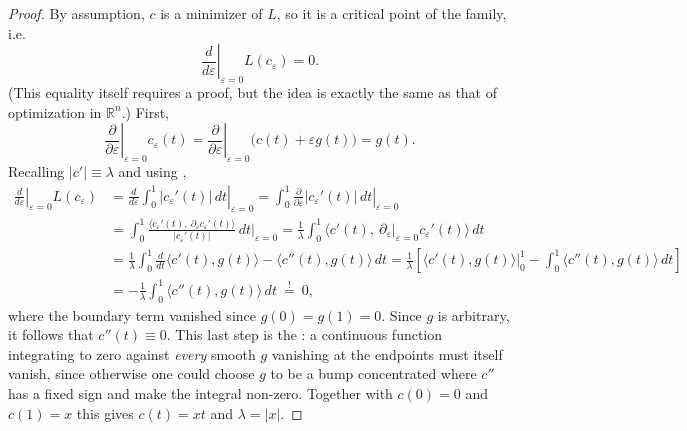 \begin{proof}
By assumption, $c$ is a minimizer of $L$, so it is a critical point of the family, i.e.
\[\left.\frac{d}{d\varepsilon}\right|_{\varepsilon=0} L(c_\varepsilon) = 0.\]
(This equality itself requires a proof, but the idea is exactly the same as that of
optimization in $\mathbb{R}^n$.) First,
\[\left.\frac{\partial}{\partial\varepsilon}\right|_{\varepsilon=0} c_\varepsilon(t)
  = \left.\frac{\partial}{\partial\varepsilon}\right|_{\varepsilon=0}
    \big(c(t)+\varepsilon g(t)\big) = g(t).\]
Recalling $\lvert c'\rvert \equiv \lambda$ and using
,
\[
\begin{aligned}
\left.\frac{d}{d\varepsilon}\right|_{\varepsilon=0} L(c_\varepsilon)
  &= \left.\frac{d}{d\varepsilon}\int_0^1 \lvert c_\varepsilon'(t)\rvert\,dt\right|_{\varepsilon=0}
   = \int_0^1 \left.\frac{\partial}{\partial\varepsilon}\lvert c_\varepsilon'(t)\rvert\,dt
     \right|_{\varepsilon=0} \\
  &= \int_0^1 \frac{\big\langle c_\varepsilon'(t),\ \partial_\varepsilon c_\varepsilon'(t)
       \big\rangle}{\lvert c_\varepsilon'(t)\rvert}\,dt\bigg|_{\varepsilon=0}
   = \frac1\lambda \int_0^1 \Big\langle c'(t),\ \partial_\varepsilon\big|_{\varepsilon=0}
       c_\varepsilon'(t)\Big\rangle\,dt \\
  &= \frac1\lambda \int_0^1 \frac{d}{dt}\Big\langle c'(t), g(t)\Big\rangle
       - \big\langle c''(t), g(t)\big\rangle\,dt
   = \frac1\lambda\left[\big\langle c'(t),g(t)\big\rangle\Big|_0^1
       - \int_0^1 \big\langle c''(t),g(t)\big\rangle\,dt\right] \\
  &= -\frac1\lambda \int_0^1 \big\langle c''(t),g(t)\big\rangle\,dt \ \overset{!}{=}\ 0,
\end{aligned}
\]
where the boundary term vanished since $g(0)=g(1)=0$. Since $g$ is arbitrary, it follows that
$c''(t) \equiv 0$. This last step is the : a continuous function integrating to zero against \emph{every} smooth $g$ vanishing
at the endpoints must itself vanish, since otherwise one could choose $g$ to be a bump
concentrated where $c''$ has a fixed sign and make the integral non-zero. Together with
$c(0)=0$ and $c(1)=x$ this gives $c(t)=xt$ and $\lambda = \lvert x\rvert$.
\end{proof}

